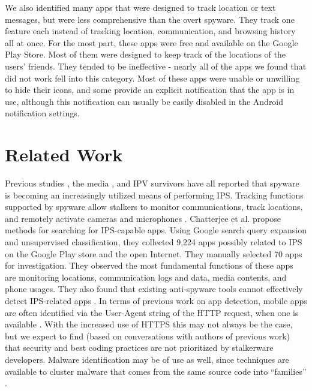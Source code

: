 \documentclass[acmtog]{acmart}
\begin{document}
We also identified many apps that were designed to track location or text 
messages, but were less comprehensive than the overt spyware. They 
track one feature each instead of tracking location, communication, and 
browsing history all at once. For the most part, these apps were free and 
available on the Google Play Store. Most of them were designed to keep track 
of the locations of the users' friends. They tended to be ineffective - nearly 
all of the apps we found that did not work fell into this category. Most of 
these apps were unable or unwilling to hide their icons, and some provide an 
explicit notification that the app is in use, although this notification can 
usually be 
easily disabled in the Android notification settings. 

\section{Related Work}
Previous studies \cite{stories_from_survivors, burke_using_2011}, the media 
\cite{shahani_smartphones_nodate, chatterjee_spyware_2018}, and IPV survivors 
\cite{ristenpart_ucsd_talk} have all reported 
that spyware is becoming an increasingly utilized means of performing
IPS. Tracking functions supported by spyware 
allow stalkers to monitor communications, track locations, and remotely 
activate cameras and microphones \cite{shahani_smartphones_nodate, 
chatterjee_spyware_2018}. Chatterjee et al. propose methods for searching for 
IPS-capable apps. Using Google search query expansion and unsupervised 
classification, they collected 9,224 apps possibly related to IPS on the Google 
Play store and the open Internet. They manually selected 70 apps for 
investigation. 
They observed the most fundamental functions of these apps are 
monitoring locations, communication logs and data, media contents, and phone 
usages. They also found that existing anti-spyware tools cannot effectively 
detect IPS-related apps \cite{chatterjee_spyware_2018}. In terms of previous 
work on app detection, mobile apps are often identified via the User-Agent 
string of the HTTP request, 
when one is available \cite{xu_identifying_2011}. With the increased use of 
HTTPS this may not always 
be the case, but we expect to find (based on conversations with authors of 
previous work) that security and best coding practices are not prioritized by 
stalkerware developers. Malware identification may be of use as well, 
since techniques are available to cluster malware that comes from the same 
source code into ``families'' \cite{hutchison_firma_2013}.
\end{document}
